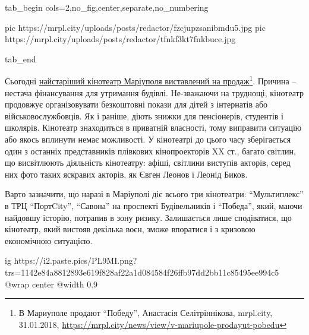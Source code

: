 
\ifcmt
  tab_begin cols=2,no_fig,center,separate,no_numbering

  pic https://mrpl.city/uploads/posts/redactor/fzcjupzsanibmdu5.jpg
  pic https://mrpl.city/uploads/posts/redactor/tfnkf3kt7fnkbuce.jpg

  tab_end
\fi

Сьогодні \href{https://mrpl.city/news/view/v-mariupole-prodayut-pobedu}{%
найстаріший кінотеатр Маріуполя виставлений на продаж}\footnote{%
В Мариуполе продают \enquote{Победу}, Анастасія Селітріннікова, mrpl.city, 31.01.2018, %
\url{https://mrpl.city/news/view/v-mariupole-prodayut-pobedu}%
}. Причина –
нестача фінансування для утримання будівлі. Не\hyp{}зважаючи на труднощі, кінотеатр
продовжує організовувати безкоштовні покази для дітей з інтернатів або
військовослужбовців. Як і раніше, діють знижки для пенсіонерів, студентів і
школярів. Кінотеатр знаходиться в приватній власності, тому виправити ситуацію
або якось вплинути немає можливості. У кінотеатрі до цього часу зберігається
один з останніх представників плівкових кінопроекторів XX ст., багато світлин,
що висвітлюють діяльність кінотеатру: афіші, світлини виступів акторів, серед
них фото таких яскравих акторів, як Євген Леонов і Леонід Биков.


Варто зазначити, що наразі в Маріуполі діє всього три кінотеатри: \enquote{Мультиплекс}
в ТРЦ \enquote{ПортCity}, \enquote{Савона} на проспекті Будівельників і \enquote{Победа}, який, маючи
найдовшу історію, потрапив в зону ризику. Залишається лише сподіватися, що
кінотеатр, який вистояв декілька воєн, зможе впоратися і з кризовою економічною
ситуацією.

\ifcmt
  ig https://i2.paste.pics/PL9MI.png?trs=1142e84a8812893e619f828af22a1d084584f26ffb97dd2bb11c85495ee994c5
  @wrap center
  @width 0.9
\fi
